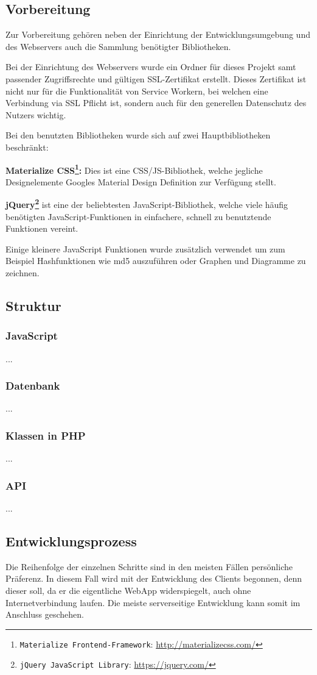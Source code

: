 \documentclass[a4paper,12pt]{scrartcl}      %
\let\oldcite\cite
\renewcommand{\cite}[1]{\textsuperscript{\oldcite{#1}}}
\newcommand{\spacer}{\par\bigskip\noindent}
\providecommand{\inlinecode}[1]{\texttt{#1}}
\begin{document}
	\subsection{Vorbereitung}
	Zur Vorbereitung gehören neben der Einrichtung der Entwicklungsumgebung und des Webservers auch die Sammlung benötigter Bibliotheken.\par
	Bei der Einrichtung des Webservers wurde ein Ordner für dieses Projekt samt passender Zugriffsrechte und gültigen SSL-Zertifikat erstellt. Dieses Zertifikat ist nicht nur für die Funktionalität von Service Workern, bei welchen eine Verbindung via SSL Pflicht ist, sondern auch für den generellen Datenschutz des Nutzers wichtig.\par
	Bei den benutzten Bibliotheken wurde sich auf zwei Hauptbibliotheken beschränkt:\par
	\spacer\textbf{Materialize CSS\footnote{\inlinecode{Materialize Frontend-Framework}: \url{http://materializecss.com/}}:} Dies ist eine CSS/JS-Bibliothek, welche jegliche Designelemente Googles Material Design Definition zur Verfügung stellt.\par
	\spacer\textbf{jQuery\footnote{\inlinecode{jQuery JavaScript Library}: \url{https://jquery.com/}}} ist eine der beliebtesten JavaScript-Bibliothek\cite{jQueryCoverage}, welche viele häufig benötigten JavaScript-Funktionen in einfachere, schnell zu benutztende Funktionen vereint.
	\spacer Einige kleinere JavaScript Funktionen wurde zusätzlich verwendet um zum Beispiel Hashfunktionen wie md5 auszuführen oder Graphen und Diagramme zu zeichnen.\par
	\subsection{Struktur}
	\subsubsection{JavaScript}
	...
	\subsubsection{Datenbank}
	...
	\subsubsection{Klassen in PHP}
	...
	\subsubsection{API}
	...
	\subsection{Entwicklungsprozess}
	Die Reihenfolge der einzelnen Schritte sind in den meisten Fällen persönliche Präferenz. In diesem Fall wird mit der Entwicklung des Clients begonnen, denn dieser soll, da er die eigentliche WebApp widerspiegelt, auch ohne Internetverbindung laufen. Die meiste serverseitige Entwicklung kann somit im Anschluss geschehen.\par
	
\end{document}
